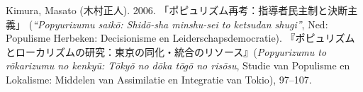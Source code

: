 \documentclass[10.5pt,dutch,]{article}
\begin{document}
\hypertarget{ref-kimuraux5fpopyurizumuux5f2006}{}
Kimura, Masato (木村正人). 2006. 「ポピュリズム再考：指導者民主制と決断主義」 (\emph{“Popyurizumu saikō: Shidō-sha minshu-sei to ketsudan shugi”}, Ned: Populisme Herbeken: Decisionisme en Leiderschapsdemocratie).  『ポピュリズムとローカリズムの研究：東京の同化・統合のリソース』(\emph{Popyurizumu to rōkarizumu no kenkyū: Tōkyō no dōka tōgō no risōsu}, Studie van Populisme en Lokalisme: Middelen van Assimilatie en Integratie van Tokio), 97–107.


\end{document}
